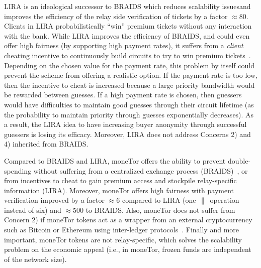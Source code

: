 LIRA is an ideological successor to BRAIDS which reduces scalability
issuesand improves the efficiency of the relay side verification of
tickets by a factor $\approx 80$. Clients in LIRA probabilistically
``win'' premium tickets without any interaction with the bank. While
LIRA improves the efficiency of BRAIDS, and could even offer high
fairness (by supporting high payment rates), it suffers from a
\textit{client} cheating incentive to continuously build circuits to
try to win premium tickets~\cite{jansen2013lira,
  jansenblogpost}. Depending on the chosen value for the payment rate,
this problem by itself could prevent the scheme from offering a
realistic option. If the payment rate is too low, then the incentive
to cheat is increased because a large priority bandwidth would be
rewarded between guesses. If a high payment rate is chosen, then
guessers would have difficulties to maintain good guesses through
their circuit lifetime (as the probability to maintain priority
through guesses exponentially decreases). As a result, the LIRA idea
to have increasing buyer anonymity through successful guessers is
losing its efficacy. Moreover, LIRA does not address Concerns 2)
and 4) inherited from BRAIDS.

Compared to BRAIDS and LIRA, moneTor offers the ability to prevent
double-spending without suffering from a centralized exchange process
(BRAIDS)~\cite{jansenblogpost}, or from incentives to cheat to gain
premium access and stockpile relay-specific information
(LIRA). Moreover, moneTor offers high fairness with payment
verification improved by a factor $\approx 6$ compared to LIRA (one
$\hash$ operation instead of six) and $\approx 500$ to BRAIDS. Also,
moneTor does not suffer from Concern 2) if moneTor tokens act as a
wrapper from an external cryptocurrency such as Bitcoin or Ethereum
using inter-ledger protocols~\cite{back2014enabling,
  poon2017plasma}.  Finally and more
important, moneTor tokens are not relay-specific, which solves the
scalability problem on the economic appeal (i.e., in moneTor, frozen
funds are independent of the network size).

